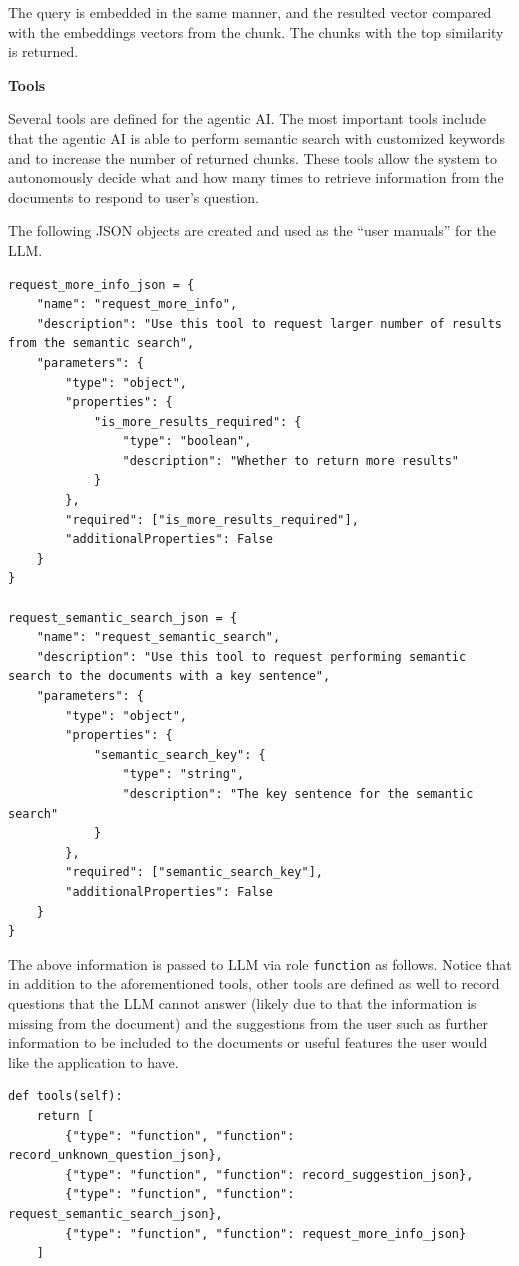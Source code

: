 The query is embedded in the same manner, and the resulted vector compared with the embeddings vectors from the chunk. The chunks with the top similarity is returned.

\vspace{0.1in}
\noindent \textbf{Tools}
\vspace{0.1in}

Several tools are defined for the agentic AI. The most important tools include that the agentic AI is able to perform semantic search with customized keywords and to increase the number of returned chunks. These tools allow the system to autonomously decide what and how many times to retrieve information from the documents to respond to user's question.

The following JSON objects are created and used as the ``user manuals'' for the LLM.

\begin{lstlisting}
request_more_info_json = {
    "name": "request_more_info",
    "description": "Use this tool to request larger number of results from the semantic search",
    "parameters": {
        "type": "object",
        "properties": {
            "is_more_results_required": {
                "type": "boolean",
                "description": "Whether to return more results"
            }
        },
        "required": ["is_more_results_required"],
        "additionalProperties": False
    }
}

request_semantic_search_json = {
    "name": "request_semantic_search",
    "description": "Use this tool to request performing semantic search to the documents with a key sentence",
    "parameters": {
        "type": "object",
        "properties": {
            "semantic_search_key": {
                "type": "string",
                "description": "The key sentence for the semantic search"
            }
        },
        "required": ["semantic_search_key"],
        "additionalProperties": False
    }
}
\end{lstlisting}

The above information is passed to LLM via role \verb|function| as follows. Notice that in addition to the aforementioned tools, other tools are defined as well to record questions that the LLM cannot answer (likely due to that the information is missing from the document) and the suggestions from the user such as further information to be included to the documents or useful features the user would like the application to have.

\begin{lstlisting}
def tools(self):
    return [
        {"type": "function", "function": record_unknown_question_json},
        {"type": "function", "function": record_suggestion_json},
        {"type": "function", "function": request_semantic_search_json},
        {"type": "function", "function": request_more_info_json}
    ]
\end{lstlisting}

